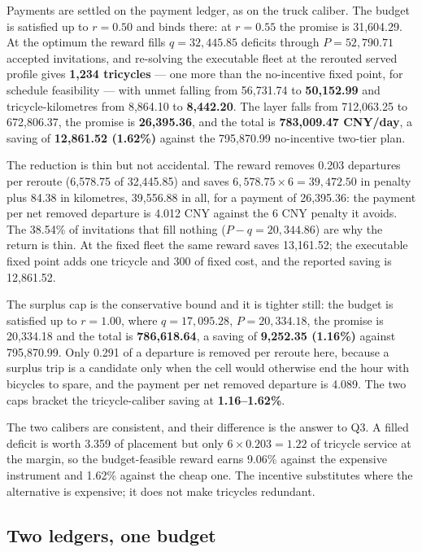 Payments are settled on the payment ledger, as on the truck caliber. The budget is
satisfied up to $r=0.50$ and binds there: at $r=0.55$ the promise is 31,604.29. At the
optimum the reward fills $q=32{,}445.85$ deficits through $P=52{,}790.71$ accepted
invitations, and re-solving the executable fleet at the rerouted served profile gives
\textbf{1,234 tricycles} --- one more than the no-incentive fixed point, for schedule
feasibility --- with unmet falling from 56,731.74 to \textbf{50,152.99} and
tricycle-kilometres from 8,864.10 to \textbf{8,442.20}. The layer falls from 712,063.25
to 672,806.37, the promise is \textbf{26,395.36}, and the total is
\textbf{783,009.47 CNY/day}, a saving of \textbf{12,861.52 (1.62\%)} against the
795,870.99 no-incentive two-tier plan.

The reduction is thin but not accidental. The reward removes 0.203 departures per
reroute (6,578.75 of 32,445.85) and saves $6,578.75\times6=39{,}472.50$ in penalty plus
84.38 in kilometres, 39,556.88 in all, for a payment of 26,395.36: the payment per net
removed departure is 4.012 CNY against the 6 CNY penalty it avoids. The 38.54\% of
invitations that fill nothing ($P-q=20{,}344.86$) are why the return is thin. At the
fixed fleet the same reward saves 13,161.52; the executable fixed point adds one
tricycle and 300 of fixed cost, and the reported saving is 12,861.52.

The surplus cap is the conservative bound and it is tighter still: the budget is
satisfied up to $r=1.00$, where $q=17{,}095.28$, $P=20{,}334.18$, the promise is
20,334.18 and the total is \textbf{786,618.64}, a saving of \textbf{9,252.35 (1.16\%)}
against 795,870.99. Only 0.291 of a departure is removed per reroute here, because a
surplus trip is a candidate only when the cell would otherwise end the hour with
bicycles to spare, and the payment per net removed departure is 4.089. The two caps
bracket the tricycle-caliber saving at \textbf{1.16--1.62\%}.

The two calibers are consistent, and their difference is the answer to Q3. A filled
deficit is worth 3.359 of placement but only $6\times0.203=1.22$ of tricycle service at
the margin, so the budget-feasible reward earns 9.06\% against the expensive instrument
and 1.62\% against the cheap one. The incentive substitutes where the alternative is
expensive; it does not make tricycles redundant.

\subsection{Two ledgers, one budget}

